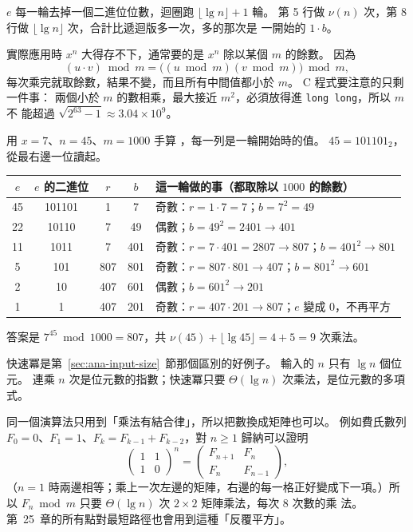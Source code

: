 $e$ 每一輪去掉一個二進位位數，迴圈跑 $\lfloor \lg n \rfloor + 1$ 輪。 第 5 行做
$\nu(n)$ 次，第 8 行做 $\lfloor \lg n \rfloor$ 次，合計比遞迴版多一次，多的那次是
一開始的 $1 \cdot b$。

實際應用時 $x^n$ 大得存不下，通常要的是 $x^n$ 除以某個 $m$ 的餘數。 因為
\[
(u \cdot v) \bmod m = \bigl((u \bmod m)(v \bmod m)\bigr) \bmod m,
\]
每次乘完就取餘數，結果不變，而且所有中間值都小於 $m$。 C 程式要注意的只剩一件事：
兩個小於 $m$ 的數相乘，最大接近 $m^2$，必須放得進 \texttt{long long}，所以 $m$ 不
能超過 $\sqrt{2^{63} - 1} \approx 3.04 \times 10^9$。

用 $x = 7$、$n = 45$、$m = 1000$ 手算 ，每一列是一輪開始時的值。
$45 = 101101_2$，從最右邊一位讀起。

\begin{center}
\begin{tabular}{ccccl}
\toprule
$e$ & $e$ 的二進位 & $r$ & $b$ & 這一輪做的事（都取除以 $1000$ 的餘數）\\
\midrule
45 & 101101 & 1 & 7 & 奇數：$r = 1 \cdot 7 = 7$；$b = 7^2 = 49$ \\
22 & 10110 & 7 & 49 & 偶數；$b = 49^2 = 2401 \to 401$ \\
11 & 1011 & 7 & 401 & 奇數：$r = 7 \cdot 401 = 2807 \to 807$；$b = 401^2 \to 801$ \\
5 & 101 & 807 & 801 & 奇數：$r = 807 \cdot 801 \to 407$；$b = 801^2 \to 601$ \\
2 & 10 & 407 & 601 & 偶數；$b = 601^2 \to 201$ \\
1 & 1 & 407 & 201 & 奇數：$r = 407 \cdot 201 \to 807$；$e$ 變成 $0$，不再平方 \\
\bottomrule
\end{tabular}
\end{center}

答案是 $7^{45} \bmod 1000 = 807$，共 $\nu(45) + \lfloor \lg 45 \rfloor = 4 + 5 = 9$
次乘法。

快速冪是第~\ref{sec:ana-input-size}~節那個區別的好例子。 輸入的 $n$ 只有 $\lg n$ 個位元。 連乘 $n$
次是位元數的指數；快速冪只要 $\Theta(\lg n)$ 次乘法，是位元數的多項式。

同一個演算法只用到「乘法有結合律」，所以把數換成矩陣也可以。 例如費氏數列
$F_0 = 0$、$F_1 = 1$、$F_{k} = F_{k-1} + F_{k-2}$，對 $n \ge 1$ 歸納可以證明
\[
\begin{pmatrix} 1 & 1 \\ 1 & 0 \end{pmatrix}^{n}
= \begin{pmatrix} F_{n+1} & F_n \\ F_n & F_{n-1} \end{pmatrix},
\]
（$n = 1$ 時兩邊相等；乘上一次左邊的矩陣，右邊的每一格正好變成下一項。）所以
$F_n \bmod m$ 只要 $\Theta(\lg n)$ 次 $2 \times 2$ 矩陣乘法，每次 $8$ 次數的乘
法。 第~25~章的所有點對最短路徑也會用到這種「反覆平方」。

